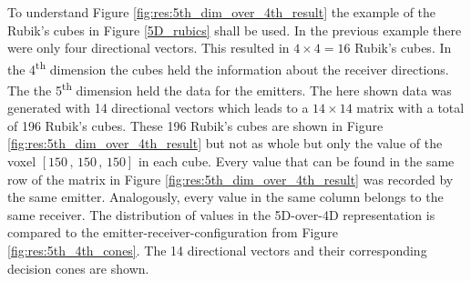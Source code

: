 To understand Figure \ref{fig:res:5th_dim_over_4th_result} the example of the Rubik's cubes in Figure \ref{5D_rubics} shall be used. In the previous example there were only four directional vectors. This resulted in $4 \times 4 = 16$ Rubik's cubes. In the 4\textsuperscript{th} dimension the cubes held the information about the receiver directions. The the 5\textsuperscript{th} dimension held the data for the emitters. The here shown data was generated with 14 directional vectors which leads to a $14 \times 14$ matrix with a total of 196 Rubik's cubes. These 196 Rubik's cubes are shown in Figure \ref{fig:res:5th_dim_over_4th_result} but not as whole but only the value of the voxel $[150\, , \, 150\, , \, 150]$ in each cube.
Every value that can be found in the same row of the matrix in Figure \ref{fig:res:5th_dim_over_4th_result} was recorded by the same emitter. Analogously, every value in the same column belongs to the same receiver. The distribution of values in the 5D-over-4D representation is compared to the emitter-receiver-configuration from Figure \ref{fig:res:5th_4th_cones}. The 14 directional vectors and their corresponding decision cones are shown.


